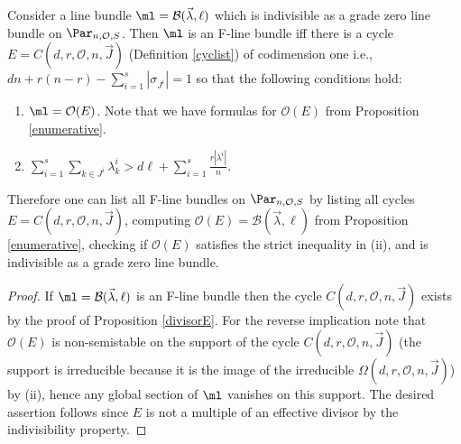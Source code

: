 \begin{proposition}
\notready\label{practical}
Consider a line bundle  $\ml=\mathcal{B}(\vec{\lambda},\ell)$ which is indivisible as a grade zero line bundle on $\Par_{n,\mathcal{O},S}$. Then $\ml$  is an F-line bundle  iff there is a cycle $E=C(d,r,\mathcal{O},n,\vec{J})$ (Definition  \ref{cyclist})  of codimension one i.e., $dn  +r(n-r)-\sum_{i=1}^s |\sigma_{J^i}|=1$ so that the following conditions hold:
\begin{enumerate}
\item[(i)] $\ml=\mathcal{O}(E)$. Note that we have formulas for $\mathcal{O}(E)$ from Proposition  \ref{enumerative}.
\item[(ii)] $\sum_{i=1}^s \sum_{k\in J^i} \lambda^i_k> d\ell +\sum_{i=1}^s \frac{r|\lambda^i|}{n}.$
\end{enumerate}
Therefore one can list all F-line bundles on $\Par_{n,\mathcal{O},S}$ by listing all cycles $E=C(d,r,\mathcal{O},n,\vec{J})$, computing $\mathcal{O}(E)=\mathcal{B}(\vec{\lambda},\ell)$ from Proposition  \ref{enumerative}, checking if $\mathcal{O}(E)$ satisfies the strict inequality in (ii), and is indivisible as a grade zero line bundle.
\end{proposition}
\begin{proof}
If $\ml=\mathcal{B}(\vec{\lambda},\ell)$ is an F-line bundle then the cycle $C(d,r,\mathcal{O},n,\vec{J})$ exists by the proof of Proposition  \ref{divisorE}. For the reverse implication note that $\mathcal{O}(E)$ is non-semistable on the support of the cycle $C(d,r,\mathcal{O},n,\vec{J})$ (the support is irreducible because it is the image of the irreducible $\Omega(d,r,\mathcal{O},n,\vec{J})$) by (ii), hence any global section of $\ml$ vanishes on this support. The desired assertion follows since  $E$ is not a multiple of an effective divisor by the indivisibility property.
\end{proof}
